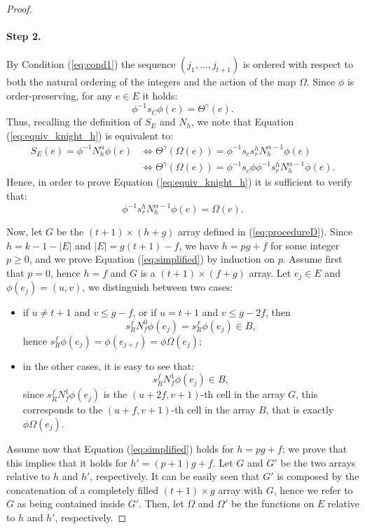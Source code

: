 \documentclass[10pt,a4paper]{amsart}
\begin{document}
\begin{proof}
\paragraph{\textbf{Step 2.}} 
By Condition (\ref{eq:cond1}) the sequence $(j_1,\dotsc, j_{t+1})$ is  ordered with respect to both the natural ordering of the integers and  the action of the map $\Omega$. Since $\phi$ is order-preserving, for any $e \in E$ it holds:
\[
	\phi^{-1} s_C \phi (e) = \Theta^\gamma(e).
\]
Thus, recalling the definition of $S_E$ and $N_h$, we note that Equation (\ref{eq:equiv_knight_h}) is equivalent to:
\[
\begin{aligned}
S_E(e) = \phi^{-1}N_h^\alpha\phi(e) &\Leftrightarrow  \Theta^\gamma(\Omega(e))  =  \phi^{-1}s_c s_r^h N_h^{\alpha-1}\phi(e) \\
& \Leftrightarrow \Theta^\gamma(\Omega(e))  =  \phi^{-1}s_c \phi \phi^{-1} s_r^h N_h^{\alpha-1}\phi(e).
\end{aligned}
\]
Hence, in order to prove Equation (\ref{eq:equiv_knight_h}) it is sufficient to verify that:
\begin{equation} \label{eq:simplified}
\phi^{-1} s_r^hN_h^{\alpha-1} \phi (e) = \Omega(e).
\end{equation}

Now, let $G$ be the $(t+1)\times (h+g)$ array defined in (\ref{eq:procedureD}).
Since $h=k-1-|E|$ and $|E|=g(t+1)-f$, we have $h = pg+f$ for some integer $p\geq0$, and  we prove Equation (\ref{eq:simplified}) by induction on $p$.
Assume first that $p=0$, hence $h=f$ and $G$ is a $(t+1)\times (f+g)$ array. Let $e_j \in E$ and $\phi(e_j) = (u,v)$, we distinguish between two cases:
\begin{itemize}
	\item if $u \neq t+1$ and $v\leq g-f$, or if $u = t+1$ and  $v\leq g-2f$, then
	\[
			s_R^f N_f^0\phi(e_j)  = s_R^f\phi(e_j) \in B,
	\]
	hence  $s_R^f\phi(e_j) = \phi(e_{j+f}) = \phi\Omega(e_{j})$;
	\item in the other cases, it is easy to see that:
	\[
s_R^f N_f^1\phi(e_j) \in B,
	\]
	since $s_R^f N_f^1\phi(e_j)$ is the $ (u+2f,v+1)$-th cell in the array $G$, this corresponds to the $(u+f,v+1)$-th cell in the array $B$, that is exactly $\phi\Omega(e_j)$.
\end{itemize}

Assume now that Equation (\ref{eq:simplified}) holds for $h = pg+f$; we prove that this implies that it holds for $h'= (p+1)g+f$. Let $G$ and $G'$ be the two arrays relative to $h$ and $h'$, respectively. It can be easily seen that $G'$ is composed by the concatenation of a completely filled $(t+1)\times g$ array with $G$, hence we refer to $G$ as being contained inside $G'$. Then, let $\Omega$ and $\Omega'$ be the functions on $E$ relative to $h$ and $h'$, respectively.



\end{proof}
\end{document}
